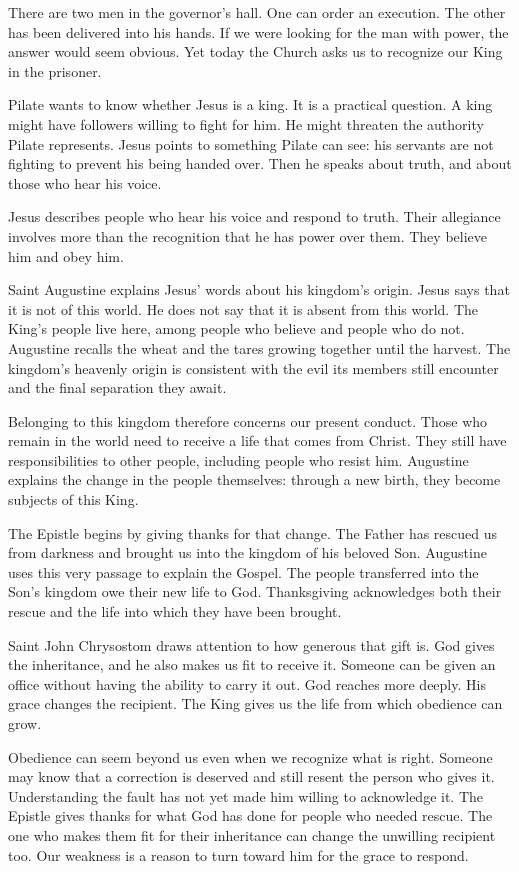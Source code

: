There are two men in the governor's hall. One can order an execution. The other has been delivered into his hands. If we were looking for the man with power, the answer would seem obvious. Yet today the Church asks us to recognize our King in the prisoner.

Pilate wants to know whether Jesus is a king. It is a practical question. A king might have followers willing to fight for him. He might threaten the authority Pilate represents. Jesus points to something Pilate can see: his servants are not fighting to prevent his being handed over. Then he speaks about truth, and about those who hear his voice.

Jesus describes people who hear his voice and respond to truth. Their allegiance involves more than the recognition that he has power over them. They believe him and obey him.

Saint Augustine explains Jesus' words about his kingdom's origin. Jesus says that it is not of this world. He does not say that it is absent from this world. The King's people live here, among people who believe and people who do not. Augustine recalls the wheat and the tares growing together until the harvest. The kingdom's heavenly origin is consistent with the evil its members still encounter and the final separation they await.

Belonging to this kingdom therefore concerns our present conduct. Those who remain in the world need to receive a life that comes from Christ. They still have responsibilities to other people, including people who resist him. Augustine explains the change in the people themselves: through a new birth, they become subjects of this King.

The Epistle begins by giving thanks for that change. The Father has rescued us from darkness and brought us into the kingdom of his beloved Son. Augustine uses this very passage to explain the Gospel. The people transferred into the Son's kingdom owe their new life to God. Thanksgiving acknowledges both their rescue and the life into which they have been brought.

Saint John Chrysostom draws attention to how generous that gift is. God gives the inheritance, and he also makes us fit to receive it. Someone can be given an office without having the ability to carry it out. God reaches more deeply. His grace changes the recipient. The King gives us the life from which obedience can grow.

Obedience can seem beyond us even when we recognize what is right. Someone may know that a correction is deserved and still resent the person who gives it. Understanding the fault has not yet made him willing to acknowledge it. The Epistle gives thanks for what God has done for people who needed rescue. The one who makes them fit for their inheritance can change the unwilling recipient too. Our weakness is a reason to turn toward him for the grace to respond.

